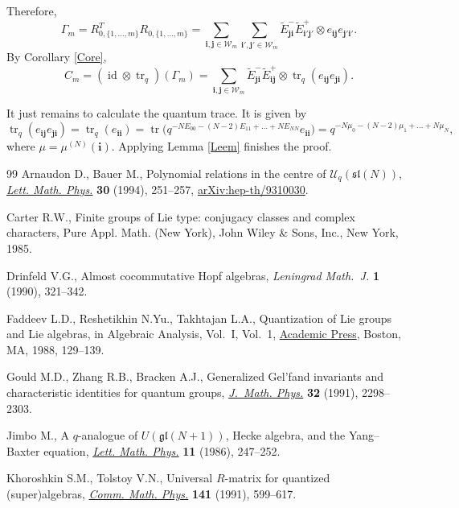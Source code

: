 \documentclass[11pt]{article}
\numberwithin{equation}{section}
\numberwithin{equation}{section}
\DeclareMathOperator{\tr}{tr}
\DeclareMathOperator{\id}{id}
\newcommand{\ii}{{\mathbf{i}}}
\newcommand{\jj}{{\mathbf{j}}}
\begin{document}
Therefore,
\[
\Gamma_m = R^T_{0,\{1,\dots,m\} } R_{0,\{1,\dots,m\} } = \sum_{\ii,\jj \in \mathcal{W}_m } \sum_{\ii',\jj' \in \mathcal{W}_m } \tilde{E}_{\jj \ii}^-\tilde{E}_{\ii'\jj'}^+ \otimes e_{\ii\jj}e_{\jj'\ii'}.
\]
By Corollary \ref{Core},
\[
C_m = (\id \otimes \tr_q)(\Gamma_m) = \sum_{\ii,\jj \in \mathcal{W}_m } \tilde{E}_{\jj \ii}^-\tilde{E}_{\ii\jj}^+ \otimes \tr_q(e_{\ii\jj}e_{\jj\ii}).
\]

It just remains to calculate the quantum trace. It is given by
\[
\tr_q(e_{\ii\jj}e_{\jj\ii}) = \tr_q(e_{\ii\ii}) = \tr\big(q^{-NE_{00} -(N-2)E_{11} + \dots + NE_{NN}} e_{\ii\ii}\big) = q^{-N\mu_{0} -(N-2)\mu_{1} + \dots + N\mu_{N}},
\]
where $\mu=\mu^{(N)}(\ii)$. Applying Lemma \ref{Leem} finishes the proof.

\begin{thebibliography}{99}
Arnaudon D., Bauer M., Polynomial relations in the centre of
 {$\mathcal{U}_q(\mathfrak{sl}(N))$}, \href{https://doi.org/10.1007/BF00805857}{\textit{Lett. Math. Phys.}} \textbf{30}
 (1994), 251--257, \href{https://arxiv.org/abs/hep-th/9310030}{arXiv:hep-th/9310030}.

Carter R.W., Finite groups of {L}ie type: conjugacy classes and complex
 characters, Pure Appl. Math. (New York), John Wiley \& Sons, Inc., New York,
 1985.

Drinfeld V.G., Almost cocommutative {H}opf algebras, \textit{Leningrad
 Math.~J.} \textbf{1} (1990), 321--342.

Faddeev L.D., Reshetikhin N.Yu., Takhtajan L.A., Quantization of {L}ie groups
 and {L}ie algebras, in Algebraic Analysis, {V}ol.~{I}, Vol.~1, \href{https://doi.org/10.1016/B978-0-12-400465-8.50019-5}{Academic
 Press}, Boston, MA, 1988, 129--139.

Gould M.D., Zhang R.B., Bracken A.J., Generalized {G}el'fand invariants and
 characteristic identities for quantum groups, \href{https://doi.org/10.1063/1.529152}{\textit{J.~Math. Phys.}}
 \textbf{32} (1991), 2298--2303.

Jimbo M., A {$q$}-analogue of {$U(\mathfrak{gl}(N+1))$}, {H}ecke algebra, and
 the {Y}ang--{B}axter equation, \href{https://doi.org/10.1007/BF00400222}{\textit{Lett. Math. Phys.}} \textbf{11} (1986),
 247--252.

Khoroshkin S.M., Tolstoy V.N., Universal {$R$}-matrix for quantized
 (super)algebras, \href{https://doi.org/10.1007/BF02102819}{\textit{Comm. Math. Phys.}} \textbf{141} (1991), 599--617.


\end{thebibliography}
\end{document}
